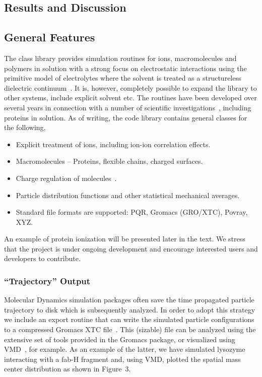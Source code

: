 \documentclass[10pt]{bmc_article}
\newenvironment{bmcformat}{\begin{raggedright}\baselineskip20pt\sloppy\setboolean{publ}{false}}{\end{raggedright}\baselineskip20pt\sloppy}
\begin{document}
\begin{bmcformat}
 
\section*{Results and Discussion}
\subsection*{General Features}
The class library provides simulation routines for ions, macromolecules and polymers in solution with a strong focus on electrostatic interactions using the primitive model of electrolytes where the solvent is treated as a structureless dielectric continuum~\cite{hill:86}.
It is, however, completely possible to expand the library to other systems, include explicit solvent etc. The routines have been developed over several years in connection with a number of scientific investigations~\cite{lund-thesis}, including proteins in solution.
As of writing, the code library contains general classes for the following,
\begin{itemize}
\item Explicit treatment of ions, including ion-ion correlation effects.
\item Macromolecules -- Proteins, flexible chains, charged surfaces.
\item Charge regulation of molecules~\cite{lund:05}.
\item Particle distribution functions and other statistical mechanical averages.
\item Standard file formats are supported: PQR, Gromacs (GRO/XTC), Povray, XYZ.
\end{itemize}
An example of protein ionization will be presented later in the text.
We stress that the project is under ongoing development and encourage interested users and developers to contribute.

\subsubsection*{``Trajectory'' Output}
Molecular Dynamics simulation packages often save the time propagated particle trajectory to disk which is subsequently analyzed.
In order to adopt this strategy we include an export routine that can write the simulated particle configurations to a compressed Gromacs XTC file~\cite{gromacs}.
This (sizable) file can be analyzed using the extensive set of tools provided in the Gromacs package, or visualized using VMD~\cite{vmd}, for example.
As an example of the latter, we have simulated lysozyme interacting with a fab-H fragment and, using VMD, plotted the spatial mass center distribution as shown in Figure~3.


\end{bmcformat}
\end{document}
